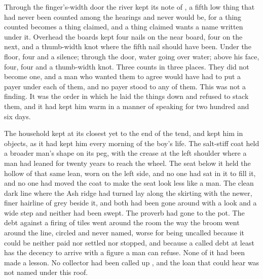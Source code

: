 Through the finger's-width door the river kept its note of , a fifth low thing that had never been counted among the hearings and never would be, for a thing counted becomes a thing claimed, and a thing claimed wants a name written under it. Overhead the boards kept four nails on the near board, four on the next, and a thumb-width knot where the fifth nail should have been. Under the floor, four and a silence; through the door, water going over water; above his face, four, four and a thumb-width knot. Three counts in three places. They did not become one, and a man who wanted them to agree would have had to put a payer under each of them, and no payer stood to any of them. This was not a finding. It was the order in which he laid the things down and refused to stack them, and it had kept him warm in a manner of speaking for two hundred and six days.

\scenebreak

The household kept  at its closest yet to the end of the tend, and kept him in objects, as it had kept him every morning of the boy's life. The salt-stiff coat held a broader man's shape on its peg, with the crease at the left shoulder where a man had leaned for twenty years to reach the wheel. The seat below it held the hollow of that same lean, worn on the left side, and no one had sat in it to fill it, and no one had moved the coat to make the seat look less like a man. The clean dark line where the Ash ridge had turned lay along the skirting with the newer, finer hairline of grey beside it, and both had been gone around with a look and a wide step and neither had been swept. The proverb had gone to the pot. The debt against a firing of tiles went around the room the way the broom went around the line, circled and never named, worse for being uncalled because it could be neither paid nor settled nor stopped, and because a called debt at least has the decency to arrive with a figure a man can refuse. None of it had been made a lesson. No collector had been called up , and the loan that could hear was not named under this roof.

